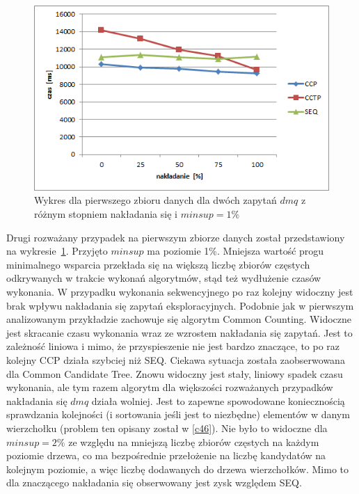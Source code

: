 \begin{figure}[h]
	\centering
	\includegraphics[width=0.8\linewidth]{figures/chart_100_1}
	\caption{Wykres dla pierwszego zbioru danych dla dwóch zapytań \(dmq\) z różnym stopniem nakładania się i \(minsup = 1\%\)}
	\label{fig:chart_100_1}
\end{figure}
Drugi rozważany przypadek na pierwszym zbiorze danych został przedstawiony na wykresie~\ref{fig:chart_100_1}. Przyjęto \(minsup\) ma poziomie 1\%. Mniejsza wartość progu minimalnego wsparcia przekłada się na większą liczbę zbiorów częstych odkrywanych w trakcie wykonań algorytmów, stąd też wydłużenie czasów wykonania. W przypadku wykonania sekwencyjnego po raz kolejny widoczny jest brak wpływu nakładania się zapytań eksploracyjnych. Podobnie jak w pierwszym analizowanym przykładzie zachowuje się algorytm Common Counting. Widoczne jest skracanie czasu wykonania wraz ze wzrostem nakładania się zapytań. Jest to zależność liniowa i mimo, że przyspieszenie nie jest bardzo znaczące, to po raz kolejny CCP działa szybciej niż SEQ. Ciekawa sytuacja została zaobserwowana dla Common Candidate Tree. Znowu widoczny jest stały, liniowy spadek czasu wykonania, ale tym razem algorytm dla większości rozważanych przypadków nakładania się \(dmq\) działa wolniej. Jest to zapewne spowodowane koniecznością sprawdzania kolejności (i sortowania jeśli jest to niezbędne) elementów w danym wierzchołku (problem ten opisany został w \ref{c46}). Nie było to widoczne dla \(minsup = 2\%\) ze względu na mniejszą liczbę zbiorów częstych na każdym poziomie drzewa, co ma bezpośrednie przełożenie na liczbę kandydatów na kolejnym poziomie, a więc liczbę dodawanych do drzewa wierzchołków. Mimo to dla znaczącego nakładania się obserwowany jest zysk względem SEQ. 


